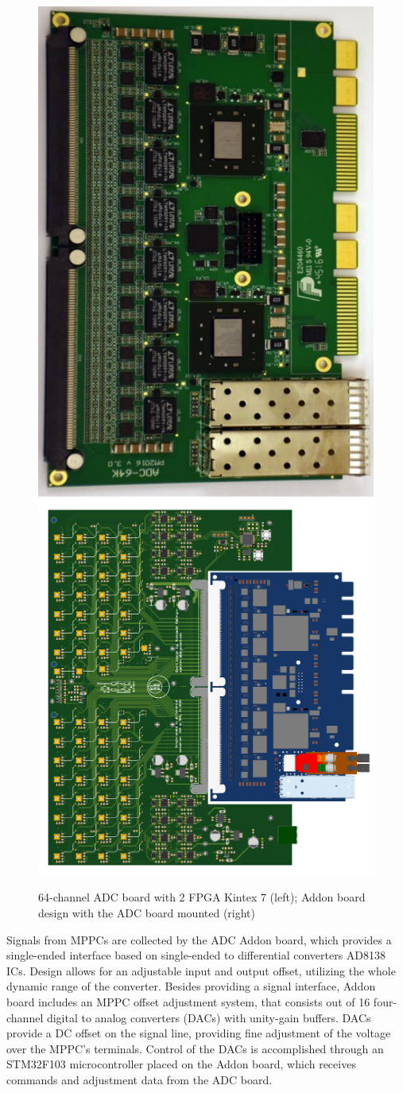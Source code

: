 \documentclass[a4paper,11pt]{article}
\begin{document}
\begin{figure}[htbp]
	\centering
	\includegraphics[width=.23\textwidth]{ADC_board.png}
	\quad
	\includegraphics[width=.3\textwidth]{ADC_addon.png}
	\caption{\label{fig:3} 64-channel ADC board with 2 FPGA Kintex 7 (left); Addon board design with the ADC board mounted (right)}
\end{figure}

Signals from MPPCs are collected by the ADC Addon board, which provides a single-ended interface based on single-ended to differential converters AD8138 ICs. Design allows for an adjustable input and output offset, utilizing the whole dynamic range of the converter. Besides providing a signal interface, Addon board includes an MPPC offset adjustment system, that consists out of 16 four-channel digital to analog converters (DACs) with unity-gain buffers. DACs provide a DC offset on the signal line, providing fine adjustment of the voltage over the MPPC's terminals. Control of the DACs is accomplished through an STM32F103 microcontroller placed on the Addon board, which receives commands and adjustment data from the ADC board.
\end{document}
